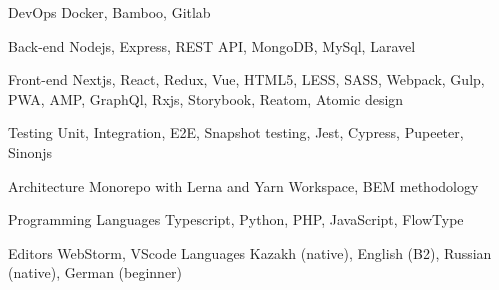 

\begin{cvskills}

  \cvskill
    {DevOps} %
    {Docker, Bamboo, Gitlab} %

  \cvskill
    {Back-end} %
    {Nodejs, Express, REST API, MongoDB, MySql, Laravel} %

  \cvskill
    {Front-end} %
    {Nextjs, React, Redux, Vue, HTML5, LESS, SASS, Webpack, Gulp, PWA, AMP, GraphQl, Rxjs, Storybook, Reatom, Atomic design} %

  \cvskill
    {Testing} %
    {Unit, Integration, E2E, Snapshot testing, Jest, Cypress, Pupeeter, Sinonjs} 

  \cvskill
    {Architecture} %
      {Monorepo with Lerna and Yarn Workspace, BEM methodology} 

  \cvskill
    {Programming Languages} %
    {Typescript, Python, PHP, JavaScript, FlowType} %

  \cvskill
    {Editors} %
    {WebStorm, VScode} 
  \cvskill
    {Languages} %
    {Kazakh (native), English (B2), Russian (native), German (beginner)} %

\end{cvskills}

